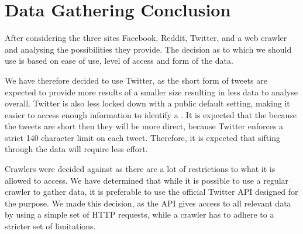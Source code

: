 \section{Data Gathering Conclusion}\label{sec:social-media-conclusion}
After considering the three sites Facebook, Reddit, Twitter, and a web crawler
and analysing the possibilities they provide. The decision as to which we
should use is based on ease of use, level of access and form of the data.\nl

We have therefore decided to use Twitter, as the short form of tweets are
expected to provide more results of a smaller size resulting in less data to
analyse overall. Twitter is also less locked down with a public default
setting, making it easier to access enough information to identify a \fb. It is
expected that the because the tweets are short then they will be more direct,
because Twitter enforces a strict 140 character limit on each tweet. Therefore,
it is expected that sifting through the data will require less effort.\nl

Crawlers were decided against as there are a lot of restrictions to what it is
allowed to access. We have determined that while it is possible to use a
regular crawler to gather data, it is preferable to use the official Twitter
\ac{API} designed for the purpose. We made this decision, as the
\ac{API} gives access to all relevant data by using a simple set of \ac{HTTP}
requests, while a crawler has to adhere to a stricter set of limitations.